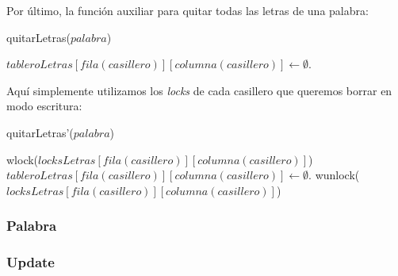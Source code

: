 Por último, la función auxiliar para quitar todas las letras de una palabra:

\begin{algorithm}[H]
\caption{quitarLetras($palabra$)}
\begin{algorithmic}[1]
        \STATE $tableroLetras[fila(casillero)][columna(casillero)] \leftarrow \emptyset$.
    \ENDFOR
\end{algorithmic}
\end{algorithm}

\noindent Aquí simplemente utilizamos los \emph{locks} de cada casillero que queremos borrar en modo escritura:

\begin{algorithm}[H]
\caption{quitarLetras'($palabra$)}
\begin{algorithmic}[1]
        \STATE wlock($locksLetras[fila(casillero)][columna(casillero)]$)
        \STATE $tableroLetras[fila(casillero)][columna(casillero)] \leftarrow \emptyset$.
        \STATE wunlock($locksLetras[fila(casillero)][columna(casillero)]$)
    \ENDFOR
\end{algorithmic}
\end{algorithm}

\subsubsection{Palabra}

\subsubsection{Update}